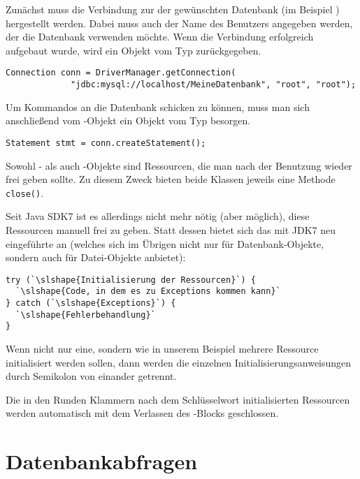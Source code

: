 Zunächst muss die Verbindung zur der gewünschten Datenbank (im Beispiel
) hergestellt werden. Dabei muss auch der Name des
Benutzers angegeben werden, der die Datenbank verwenden möchte. Wenn die
Verbindung erfolgreich aufgebaut wurde, wird ein Objekt vom Typ
 zurückgegeben.

\begin{lstlisting}
Connection conn = DriverManager.getConnection(
             "jdbc:mysql://localhost/MeineDatenbank", "root", "root");
\end{lstlisting}

Um Kommandos an die Datenbank schicken zu können, muss man sich anschließend vom
-Objekt ein Objekt vom Typ  besorgen.

\begin{lstlisting}
Statement stmt = conn.createStatement();
\end{lstlisting}

Sowohl - als auch -Objekte sind
Ressourcen, die man nach der Benutzung wieder frei geben sollte. Zu diesem Zweck
bieten beide Klassen jeweils eine Methode \lstinline|close()|.

Seit Java SDK7 ist es allerdings nicht mehr nötig (aber möglich), diese
Ressourcen manuell frei zu geben. Statt dessen bietet sich das mit JDK7 neu
eingeführte  an (welches sich im Übrigen nicht
nur für Datenbank-Objekte, sondern auch für Datei-Objekte anbietet):

\begin{lstlisting}
try (`\slshape{Initialisierung der Ressourcen}`) {
  `\slshape{Code, in dem es zu Exceptions kommen kann}`
} catch (`\slshape{Exceptions}`) {
  `\slshape{Fehlerbehandlung}`
}
\end{lstlisting}

Wenn nicht nur eine, sondern wie in unserem Beispiel mehrere Ressource
initialisiert werden sollen, dann werden die einzelnen
Initialisierungsanweisungen durch Semikolon von einander getrennt.

Die in den Runden Klammern nach dem Schlüsselwort 
initialisierten Ressourcen werden automatisch mit dem Verlassen des
-Blocks geschlossen.

\section{Datenbankabfragen}

